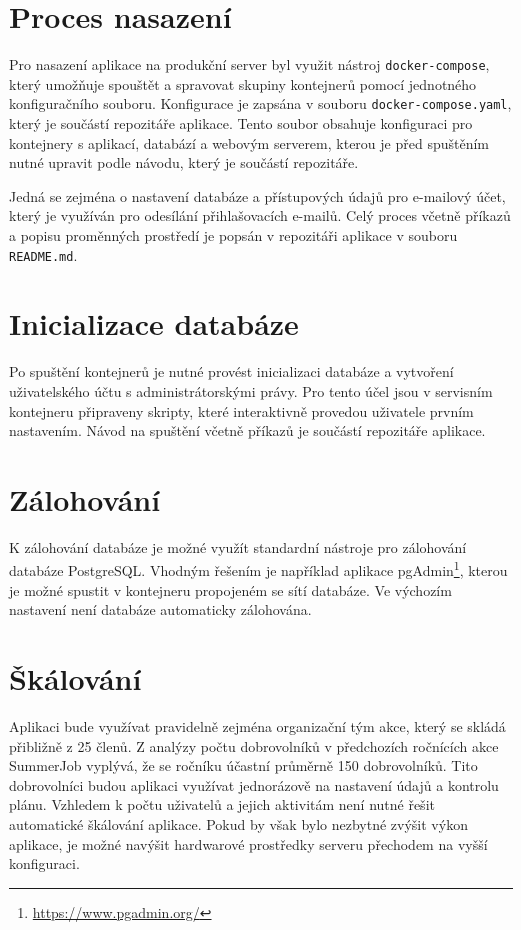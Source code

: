 \section{Proces nasazení}

Pro nasazení aplikace na produkční server byl využit nástroj \texttt{docker-compose}, který
umožňuje spouštět a spravovat skupiny kontejnerů pomocí jednotného konfiguračního souboru.
Konfigurace je zapsána v souboru \texttt{docker-compose.yaml}, který je součástí repozitáře aplikace.
Tento soubor obsahuje konfiguraci pro kontejnery s aplikací, databází a webovým serverem, kterou 
je před spuštěním nutné upravit podle návodu, který je součástí repozitáře.

Jedná se zejména o nastavení databáze a přístupových údajů pro e-mailový účet, který je využíván
pro odesílání přihlašovacích e-mailů. Celý proces včetně příkazů a popisu proměnných prostředí je popsán
v repozitáři aplikace v souboru \texttt{README.md}.

\section{Inicializace databáze}

Po spuštění kontejnerů je nutné provést inicializaci databáze
a vytvoření uživatelského účtu s administrátorskými právy. Pro tento účel jsou v servisním kontejneru připraveny skripty,
které interaktivně provedou uživatele prvním nastavením. Návod na spuštění včetně příkazů je součástí repozitáře aplikace.

\section{Zálohování}

K zálohování databáze je možné využít standardní nástroje pro zálohování databáze PostgreSQL.
Vhodným řešením je například aplikace pgAdmin\footnote{\url{https://www.pgadmin.org/}}, kterou
je možné spustit v kontejneru propojeném se sítí databáze.
Ve výchozím nastavení není databáze automaticky zálohována.

\section{Škálování}

 Aplikaci bude využívat
pravidelně zejména organizační tým akce, který se skládá přibližně z 25 členů. Z analýzy počtu dobrovolníků v předchozích ročnících akce SummerJob vyplývá, že
se ročníku účastní průměrně 150 dobrovolníků. Tito dobrovolníci budou aplikaci využívat jednorázově na nastavení údajů a kontrolu plánu.
Vzhledem k počtu uživatelů a jejich aktivitám není nutné řešit automatické škálování aplikace. Pokud by však bylo nezbytné
zvýšit výkon aplikace, je možné navýšit hardwarové prostředky serveru přechodem na vyšší konfiguraci.